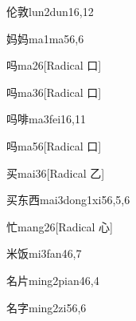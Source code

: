 \begin{verbete}{伦敦}{lun2dun1}{6,12}
\end{verbete}

\begin{verbete}{妈妈}{ma1ma5}{6,6}
\end{verbete}

\begin{verbete}{吗}{ma2}{6}[Radical 口]
\end{verbete}

\begin{verbete}{吗}{ma3}{6}[Radical 口]
\end{verbete}

\begin{verbete*}{吗啡}{ma3fei1}{6,11}
\end{verbete*}

\begin{verbete}{吗}{ma5}{6}[Radical 口]
\end{verbete}

\begin{verbete}{买}{mai3}{6}[Radical 乙]
\end{verbete}

\begin{verbete}{买东西}{mai3dong1xi5}{6,5,6}
\end{verbete}

\begin{verbete}{忙}{mang2}{6}[Radical 心]
\end{verbete}

\begin{verbete}{米饭}{mi3fan4}{6,7}
\end{verbete}

\begin{verbete}{名片}{ming2pian4}{6,4}
\end{verbete}

\begin{verbete}{名字}{ming2zi5}{6,6}
\end{verbete}

